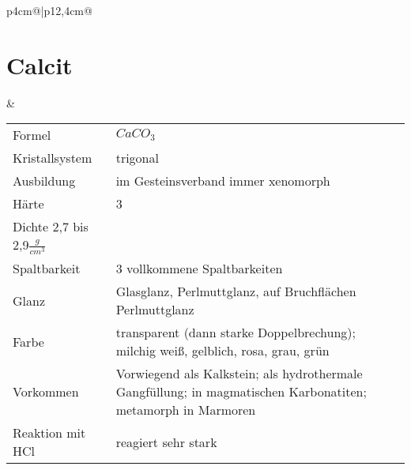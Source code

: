 \documentclass[a4, 12pt]{scrreprt}
\begin{document}
\begin{tabular}{p{4cm}@{}|p{}@{}}
\section{Calcit} &
	\begin{tabular}{p{3cm}@{}p{9cm}@{}}
	Formel & $CaCO_3$\\
	Kristallsystem & trigonal\\
	Ausbildung & im Gesteinsverband immer xenomorph\\
	Härte & 3\\
	Dichte 2,7 bis 2,9$\frac{g}{cm^3}$\\
	Spaltbarkeit & 3 vollkommene Spaltbarkeiten\\
	Glanz & Glasglanz, Perlmuttglanz, auf Bruchflächen Perlmuttglanz\\
	Farbe & transparent (dann starke Doppelbrechung); milchig weiß, gelblich, rosa, grau, grün\\
	Vorkommen & Vorwiegend als Kalkstein; als hydrothermale Gangfüllung;
in magmatischen Karbonatiten; metamorph in Marmoren\\
	Reaktion mit HCl & reagiert sehr stark
	\end{tabular}\\
\hline
\end{tabular}

\newpage
\end{document}

